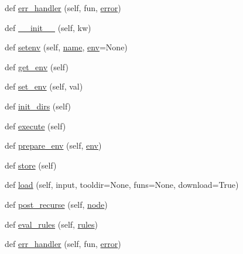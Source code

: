\begin{DoxyCompactItemize}
def \hyperlink{classwaflib_1_1_configure_1_1_configuration_context_acc349b079382fdac3d626eb46bd54b7e}{err\+\_\+handler} (self, fun, \hyperlink{sndfile__save_8m_ada4b423bc19e6ff5c5b514e55f518a82}{error})
\item 
def \hyperlink{classwaflib_1_1_configure_1_1_configuration_context_a0f139855aa53920d6f30a05e10253ab0}{\+\_\+\+\_\+init\+\_\+\+\_\+} (self, kw)
\item 
def \hyperlink{classwaflib_1_1_configure_1_1_configuration_context_a2ed4960105cdf08c13cd178367ae1818}{setenv} (self, \hyperlink{lib_2expat_8h_a1b49b495b59f9e73205b69ad1a2965b0}{name}, \hyperlink{classwaflib_1_1_configure_1_1_configuration_context_a390267f6d3529fe07447ffb4925ca533}{env}=None)
\item 
def \hyperlink{classwaflib_1_1_configure_1_1_configuration_context_a5f2dfad34690147826b09413246140f7}{get\+\_\+env} (self)
\item 
def \hyperlink{classwaflib_1_1_configure_1_1_configuration_context_ad30b269279dd9c24e6d892bb3b2fc583}{set\+\_\+env} (self, val)
\item 
def \hyperlink{classwaflib_1_1_configure_1_1_configuration_context_a782925b68e221c10f8e08433329364c9}{init\+\_\+dirs} (self)
\item 
def \hyperlink{classwaflib_1_1_configure_1_1_configuration_context_a2dadcc441cc31bb49159c709bae0ec32}{execute} (self)
\item 
def \hyperlink{classwaflib_1_1_configure_1_1_configuration_context_a913063288a6135c3105acf180e7f0f0c}{prepare\+\_\+env} (self, \hyperlink{classwaflib_1_1_configure_1_1_configuration_context_a390267f6d3529fe07447ffb4925ca533}{env})
\item 
def \hyperlink{classwaflib_1_1_configure_1_1_configuration_context_aadaed27da973f44dde6eaa890026be35}{store} (self)
\item 
def \hyperlink{classwaflib_1_1_configure_1_1_configuration_context_ae13e6fac1db3060edb50337f97b7be3f}{load} (self, input, tooldir=None, funs=None, download=True)
\item 
def \hyperlink{classwaflib_1_1_configure_1_1_configuration_context_a9620736938604c56dc26964b06a24e2e}{post\+\_\+recurse} (self, \hyperlink{structnode}{node})
\item 
def \hyperlink{classwaflib_1_1_configure_1_1_configuration_context_af1b5fdd6d958f8b996dba916c44ec9fa}{eval\+\_\+rules} (self, \hyperlink{classwaflib_1_1_configure_1_1_configuration_context_a279ad5a7c2630c4416afc36cad85a2db}{rules})
\item 
def \hyperlink{classwaflib_1_1_configure_1_1_configuration_context_acc349b079382fdac3d626eb46bd54b7e}{err\+\_\+handler} (self, fun, \hyperlink{sndfile__save_8m_ada4b423bc19e6ff5c5b514e55f518a82}{error})

\end{DoxyCompactItemize}
